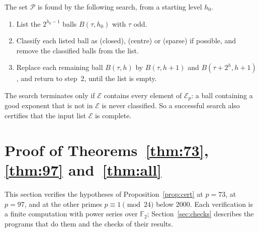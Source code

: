 \documentclass[12pt]{amsart}
\theoremstyle{definition}
\newcommand{\F}{\mathbb{F}_2}
\newcommand{\cE}{\mathcal{E}}
\newcommand{\B}{B}
\begin{document}
The set $\mathcal{P}$ is found by the following search, from a starting level $h_0$.
\begin{enumerate}
\item List the $2^{h_0-1}$ balls $\B(\tau,h_0)$ with $\tau$ odd.
\item Classify each listed ball as (closed), (centre) or (sparse) if possible, and remove the classified balls from the list.
\item Replace each remaining ball $\B(\tau,h)$ by $\B(\tau,h+1)$ and $\B(\tau+2^h,h+1)$, and return to step~2, until the list is empty.
\end{enumerate}
The search terminates only if $\cE$ contains every element of $\cE_p$: a ball containing a good exponent that is not in $\cE$ is never classified. So a successful search also certifies that the input list $\cE$ is complete.

\section{\texorpdfstring{Proof of Theorems~\ref{thm:73}, \ref{thm:97} and~\ref{thm:all}}{Proof of Theorems 1, 2 and 3}}\label{sec:proof}

This section verifies the hypotheses of Proposition~\ref{prop:cert} at $p=73$, at $p=97$, and at the other primes $p\equiv1\pmod{24}$ below $2000$. Each verification is a finite computation with power series over $\F$; Section~\ref{sec:checks} describes the programs that do them and the checks of their results.
\end{document}
